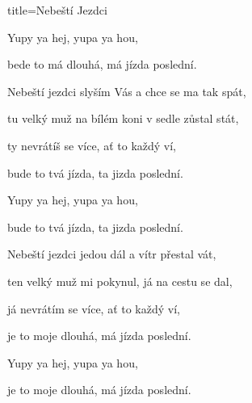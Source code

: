 \begin{song}{title=\centering Nebeští Jezdci \\\normalsize \vspace*{-0.3cm}}
{\begin{minipage}[t]{0.57\textwidth}
	Yupy ya hej, yupa ya hou,
	
	bede to má dlouhá, má jízda poslední.
		

\end{minipage}\begin{minipage}[t]{0.55\textwidth}\setlength{\parindent}{0.45cm}\vspace*{0.55cm}  %

\sloka
	Nebeští jezdci slyším Vás a chce se ma tak spát,
	
	tu velký muž na bílém koni v sedle zůstal stát,
	
	ty nevrátíš se více, ať to každý ví,
	
	bude to tvá jízda, ta jizda poslední.
	
	Yupy ya hej, yupa ya hou,
	
	bude to tvá jízda, ta jizda poslední.
	
\sloka
	Nebeští jezdci jedou dál a vítr přestal vát,
	
	ten velký muž mi pokynul, já na cestu se dal,
	
	já nevrátím se více, ať to každý ví,
	
	je to moje dlouhá, má jízda poslední.
	
	Yupy ya hej, yupa ya hou,
	
	je to moje dlouhá, má jízda poslední.


\end{minipage}
}
\setcounter{Slokočet}{0}
\end{song}

